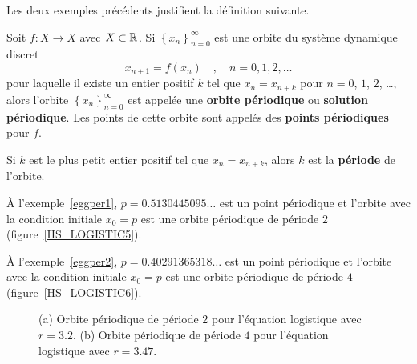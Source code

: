 {Les deux exemples précédents justifient la définition suivante.

\begin{defn}
Soit $f:X \to X$ avec $X \subset \mathbb{R}$.  Si
$\displaystyle \left\{ x_n \right\}_{n=0}^\infty$ est une orbite du
système dynamique discret
\[
x_{n+1} = f(x_n) \quad , \quad n=0, 1, 2, \ldots
\]
pour laquelle il existe un entier positif $k$ tel que $x_n = x_{n+k}$
pour $n=0$, $1$, $2$, \ldots, alors l'orbite 
$\displaystyle \left\{ x_n \right\}_{n=0}^\infty$ est appelée une
{\bfseries orbite périodique}
ou {\bfseries solution périodique}.  Les
points de cette orbite sont appelés des
{\bfseries points périodiques} pour $f$.

Si $k$ est le plus petit entier positif tel que $x_n = x_{n+k}$, alors
$k$ est la {\bfseries période} de l'orbite.
\end{defn}

\begin{egg}
À l'exemple~\ref{eggper1}, $p=0.5130445095\ldots$ est un point
périodique et l'orbite avec la condition initiale $x_0=p$ est une
orbite périodique de période $2$ (figure~\ref{HS_LOGISTIC5}).

À l'exemple~\ref{eggper2}, $p=0.40291365318\ldots$ est un point
périodique et l'orbite avec la condition initiale $x_0=p$ est une
orbite périodique de période $4$ (figure~\ref{HS_LOGISTIC6}).
\end{egg}

\begin{figure}
\centering
{}
\qquad
{}
\caption[Orbites périodiques de période $2$ et $4$ pour l'équation logistique]
{(a) Orbite périodique de période $2$ pour l'équation logistique avec
$r=3.2$.  (b) Orbite périodique de période $4$ pour l'équation
logistique avec $r=3.47$.}\label{HS_LOGISTIC56}
\end{figure}

}
